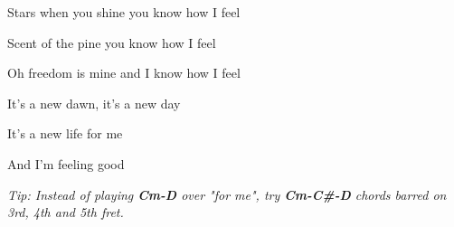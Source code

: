 \begin{song}
\bigskip

 Stars when you shine  you know how I feel \par
{} Scent of the pine  you know how I feel \par
Oh freedom is mine and I know how I feel \par
It's a new dawn, it's a new day \par
It's a new life  for me  \par
And I'm feeling good    \par
{} \par

\bigskip

\bigskip

{
\smaller\it Tip: Instead of playing \textbf{Cm-D} over "for me", try \textbf{Cm-C\#-D} chords barred on 3rd, 4th and 5th fret.
}

\end{song}